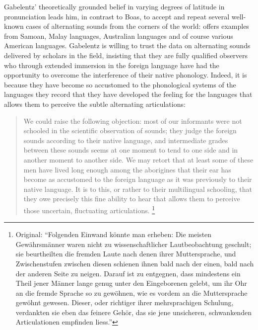\documentclass[output=paper]{langscibook}
\begin{document}
Gabelentz' theoretically grounded belief in varying degrees of latitude in pronunciation leads him, in contrast to Boas, to accept and repeat several well-known cases of alternating sounds from the corners of the world: \citet[202-204]{Gabelentz20161891} offers examples from Samoan, Malay languages, Australian languages and of course various American languages. Gabelentz is willing to trust the data on alternating sounds delivered by scholars in the field, insisting that they are fully qualified observers who through extended immersion in the foreign language have had the opportunity to overcome the interference of their native phonology. Indeed, it is because they have become so accustomed to the phonological systems of the languages they record that they have developed the feeling for the languages that allows them to perceive the subtle alternating articulations:

\begin{quotation}
We could raise the following objection: most of our informants were not schooled in the scientific observation of sounds; they judge the foreign sounds according to their native language, and intermediate grades between these sounds seems at one moment to tend to one side and in another moment to another side. We may retort that at least some of these men have lived long enough among the aborigines that their ear has become as accustomed to the foreign language as it was previously to their native language. It is to this, or rather to their multilingual schooling, that they owe precisely this fine ability to hear that allows them to perceive those uncertain, fluctuating articulations. \citep[204-205]{Gabelentz20161891}\footnote{Original: ``Folgenden Einwand könnte man erheben: Die meisten Gewährsmänner waren nicht zu wissenschaftlicher Lautbeobachtung geschult; sie beurtheilten die fremden Laute nach denen ihrer Muttersprache, und Zwischenstufen zwischen diesen schienen ihnen bald nach der einen, bald nach der anderen Seite zu neigen. Darauf ist zu entgegnen, dass mindestens ein Theil jener Männer lange genug unter den Eingeborenen gelebt, um ihr Ohr an die fremde Sprache so zu gewöhnen, wie es vordem an die Muttersprache gewöhnt gewesen. Dieser, oder richtiger ihrer mehrsprachigen Schulung, verdankten sie eben das feinere Gehör, das sie jene unsicheren, schwankenden Articulationen empfinden liess.''}
\end{quotation}
\end{document}
